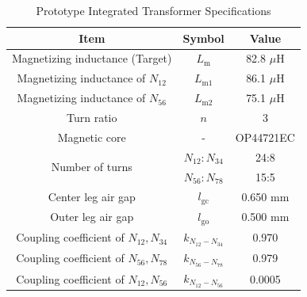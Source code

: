 \documentclass[lettersize,journal]{IEEEtran}
\begin{document}
\begin{table}[h]
    \caption{Prototype Integrated Transformer Specifications}
    \centering
    \footnotesize
    \setlength{\tabcolsep}{4pt} 
    \begin{tabular}{ccc}
        \hline
        \textbf{Item} & \textbf{Symbol} & \textbf{Value} \\
        \hline \hline
        Magnetizing inductance (Target) & $L_{\mathrm{m}}$ & 82.8 $\mu$H \\
        Magnetizing inductance of $N_{12}$ & $L_{\mathrm{m}1}$ & 86.1 $\mu$H \\
        Magnetizing inductance of $N_{56}$ & $L_{\mathrm{m}2}$ & 75.1 $\mu$H \\
        Turn ratio & $n$ & 3 \\
        Magnetic core & - & OP44721EC \\
        \multirow{2}{*}{Number of turns} & $N_{12}:N_{34}$ & 24:8 \\
                                         & $N_{56}:N_{78}$ & 15:5 \\
        Center leg air gap & $l_{\mathrm{gc}}$ & 0.650 mm \\
        Outer leg air gap & $l_{\mathrm{go}}$ & 0.500 mm \\
        Coupling coefficient of $N_{12}, N_{34}$ & $k_{N_{12}-N_{34}}$ & 0.970 \\
        Coupling coefficient of $N_{56}, N_{78}$ & $k_{N_{56}-N_{78}}$ & 0.979 \\
        Coupling coefficient of $N_{12}, N_{56}$ & $k_{N_{12}-N_{56}}$ & 0.0005 \\
        \hline
    \end{tabular}
    \label{tab:prototype_transformer}
\end{table}
\end{document}
